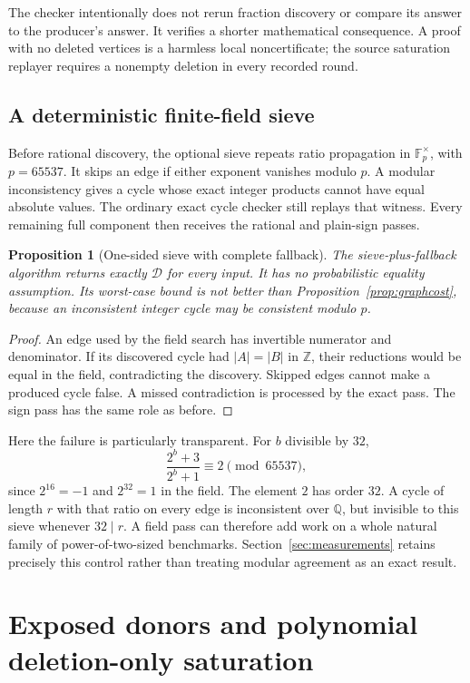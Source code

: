 \documentclass[11pt]{article}
\newtheorem{proposition}[theorem]{Proposition}
\theoremstyle{definition}\newtheorem{definition}[theorem]{Definition}
\theoremstyle{remark}\newtheorem{remark}[theorem]{Remark}
\newcommand{\Z}{\mathbb Z}\newcommand{\Q}{\mathbb Q}\newcommand{\F}{\mathbb F}
\newcommand{\dead}{\mathcal D}
\begin{document}
The checker intentionally does not rerun fraction discovery or compare its
answer to the producer's answer. It verifies a shorter mathematical
consequence. A proof with no deleted vertices is a harmless local
noncertificate; the source saturation replayer requires a nonempty deletion
in every recorded round.

\subsection{A deterministic finite-field sieve}
Before rational discovery, the optional sieve repeats ratio propagation in
$\F_p^\times$, with $p=65537$. It skips an edge if either exponent vanishes
modulo $p$. A modular inconsistency gives a cycle whose exact integer
products cannot have equal absolute values. The ordinary exact cycle
checker still replays that witness. Every remaining full component then
receives the rational and plain-sign passes.

\begin{proposition}[One-sided sieve with complete fallback]\label{prop:sieve}
The sieve-plus-fallback algorithm returns exactly $\dead$ for every input.
It has no probabilistic equality assumption. Its worst-case bound is not
better than Proposition~\ref{prop:graphcost}, because an inconsistent
integer cycle may be consistent modulo $p$.
\end{proposition}
\begin{proof}
An edge used by the field search has invertible numerator and denominator.
If its discovered cycle had $|A|=|B|$ in $\Z$, their reductions would be
equal in the field, contradicting the discovery. Skipped edges cannot
make a produced cycle false. A missed contradiction is processed by the
exact pass. The sign pass has the same role as before.
\end{proof}

Here the failure is particularly transparent. For $b$ divisible by $32$,
\[
 \frac{2^b+3}{2^b+1}\equiv2\pmod{65537},
\]
since $2^{16}=-1$ and $2^{32}=1$ in the field. The element $2$ has order
$32$. A cycle of length $r$ with that ratio on every edge is inconsistent
over $\Q$, but invisible to this sieve whenever $32\mid r$. A field pass
can therefore add work on a whole natural family of power-of-two-sized
benchmarks. Section~\ref{sec:measurements} retains precisely this control
rather than treating modular agreement as an exact result.

\section{Exposed donors and polynomial deletion-only saturation}
\label{sec:saturation}
\end{document}
